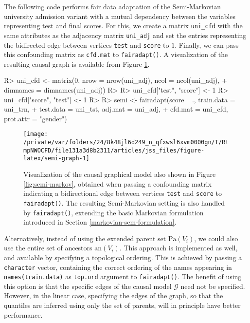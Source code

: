 \documentclass[
  nojss]{jss}
\begin{document}
The following code performs fair data adaptation of the Semi-Markovian
university admission variant with a mutual dependency between the
variables representing test and final scores. For this, we create a
matrix \texttt{uni\_cfd} with the same attributes as the adjacency
matrix \texttt{uni\_adj} and set the entries representing the bidirected
edge between vertices \texttt{test} and \texttt{score} to \(1\).
Finally, we can pass this confounding matrix as \texttt{cfd.mat} to
\texttt{fairadapt()}. A visualization of the resulting causal graph is
available from Figure \ref{fig:semi-graph}.

\begin{CodeChunk}
\begin{CodeInput}
R> uni_cfd <- matrix(0, nrow = nrow(uni_adj), ncol = ncol(uni_adj),
+                   dimnames = dimnames(uni_adj))
R> 
R> uni_cfd["test", "score"] <- 1
R> uni_cfd["score", "test"] <- 1
R> 
R> semi <- fairadapt(score ~ ., train.data = uni_trn,
+                   test.data = uni_tst, adj.mat = uni_adj,
+                   cfd.mat = uni_cfd, prot.attr = "gender")
\end{CodeInput}
\end{CodeChunk}

\begin{CodeChunk}
\begin{figure}

{\centering \texttt{[image: /private/var/folders/24/8k48jl6d249\_n\_qfxwsl6xvm0000gn/T/RtmpNWOCFD/file131a3d8b2311/articles/jss\_files/figure-latex/semi-graph-1]} 

}

\caption{Visualization of the causal graphical model also shown in Figure \ref{fig:semi-markov}, obtained when passing a confounding matrix indicating a bidirectional edge between vertices \texttt{test} and \texttt{score} to \texttt{fairadapt()}. The resulting Semi-Markovian setting is also handled by \texttt{fairadapt()}, extending the basic Markovian formulation introduced in Section \ref{markovian-scm-formulation}.}\label{fig:semi-graph}
\end{figure}
\end{CodeChunk}

Alternatively, instead of using the extended parent set
\(\mathrm{Pa}(V_i)\), we could also use the entire set of ancestors
\(\mathrm{an}(V_i)\). This approach is implemented as well, and
available by specifying a topological ordering. This is achieved by
passing a \texttt{character} vector, containing the correct ordering of
the names appearing in \texttt{names(train.data)} as \texttt{top.ord}
argument to \texttt{fairadapt()}. The benefit of using this option is
that the specific edges of the causal model \(\mathcal{G}\) need not be
specified. However, in the linear case, specifying the edges of the
graph, so that the quantiles are inferred using only the set of parents,
will in principle have better performance.
\end{document}
